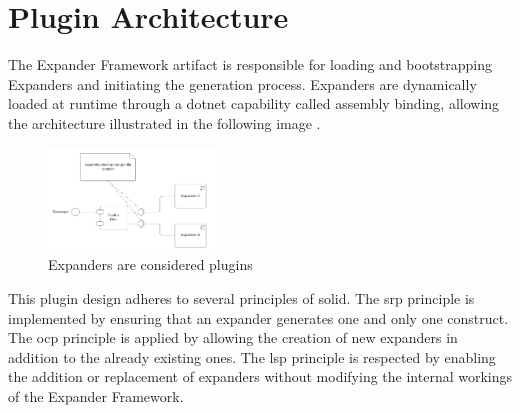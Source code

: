 \section{Plugin Architecture} \label{subsec_plugin_architecture}

The Expander Framework artifact is responsible for loading and bootstrapping Expanders and
initiating the generation process. Expanders are dynamically loaded at runtime through a
dotnet capability called assembly binding, allowing the architecture illustrated in the
following image \parencite{koks_expanderpluginloaderinteractor_2023}.

\begin{figure}[htbp]
  \centering
  \includegraphics[width=0.4\textwidth]{figures/plugin_architecture.pdf}
  \caption[Plugin Archticture]{Expanders are considered plugins}
  \label{fi:plugin_architecture}
\end{figure}

This plugin design adheres to several principles of \gls{solid}. The \gls{srp} principle
is implemented by ensuring that an expander generates one and only one construct. The
\gls{ocp} principle is applied by allowing the creation of new expanders in addition to
the already existing ones. The \gls{lsp} principle is respected by enabling the addition
or replacement of expanders without modifying the internal workings of the Expander
Framework.